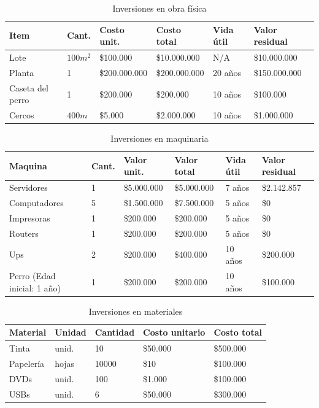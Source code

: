 \documentclass[a4paper, 12pt, oneside]{article}
\begin{document}
	\begin{table}
		\caption{Inversiones en obra física}
		\begin{tabular}{ | p{3cm} | p{1cm} | p{2.5cm} | p{2.5cm} | p{1cm} | p{2.2cm} | }
		\hline
		Item & Cant. & Costo unit. & Costo total & Vida útil & Valor residual \\
		\hline					
		Lote & $100m^2$ & \$100.000 & \$10.000.000 & N/A & \$10.000.000 \\
		\hline					
		Planta & 1 & \$200.000.000 & \$200.000.000 & 20 años & \$150.000.000 \\
		\hline
		Caseta del perro & 1 & \$200.000 & \$200.000 & 10 años & \$100.000 \\ 
		\hline
		Cercos & $400m$ & \$5.000 & \$2.000.000 & 10 años & \$1.000.000 \\
		\hline
		\end{tabular}
		\label{tb:invFisica}
	\end{table}

	\begin{table}
		\caption{Inversiones en maquinaria}
		\begin{tabular}{ | p{3cm} | p{1cm} | p{2.5cm} | p{2.5cm} | p{1cm} | p{2cm} | }
		\hline
		Maquina & Cant. & Valor unit. & Valor total & Vida útil & Valor residual \\
		\hline					
		Servidores & 1 & \$5.000.000 & \$5.000.000 & 7 años & \$2.142.857 \\
		\hline					
		Computadores & 5 & \$1.500.000 & \$7.500.000 & 5 años & \$0 \\
		\hline
		Impresoras & 1 & \$200.000 & \$200.000 & 5 años & \$0 \\ 
		\hline
		Routers & 1 & \$200.000 & \$200.000 & 5 años & \$0 \\
		\hline
		Ups & 2 & \$200.000 & \$400.000 & 10 años & \$200.000 \\
		\hline
		Perro (Edad inicial: 1 año) & 1 & \$200.000 & \$200.000 & 10 años & \$100.000 \\
		\hline
		\end{tabular}
		\label{tb:invMaquinaria}
	\end{table}

	\begin{table}
		\caption{Inversiones en materiales}
		\begin{tabular}{ | p{3cm} | p{1.5cm} | p{1.5cm} | p{2cm} | p{2cm} | }
		\hline
		Material & Unidad & Cantidad & Costo unitario & Costo total \\
		\hline
		Tinta & unid. & 10 & \$50.000 & \$500.000 \\ 
		\hline					
		Papelería & hojas & 10000 & \$10 & \$100.000 \\
		\hline
		DVDs & unid. & 100 & \$1.000 & \$100.000 \\
		\hline
		USBs & unid. & 6 & \$50.000 & \$300.000 \\
		\hline
		\end{tabular}
		\label{tb:invMateriales}
	\end{table}
\end{document}
